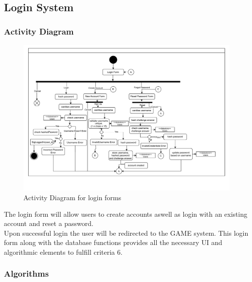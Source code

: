 \documentclass{article}
\begin{document}
        \subsection{Login System}
        \subsubsection{Activity Diagram}
        \begin{figure}[H]
                \centering
                \includegraphics[width=\textwidth, trim = 0 50 0 0, clip]{images/design/Login_System.pdf}
                \caption{Activity Diagram for login forms}
                
        \end{figure}
        The login form will allow users to create accounts aswell as login with an existing account and reset a password.\\
        Upon successful login the user will be redirected to the GAME system. This login form along with the database functions provides all the necessary UI and algorithmic elements to fulfill criteria 6.\\
        \subsubsection{Algorithms}
\end{document}
